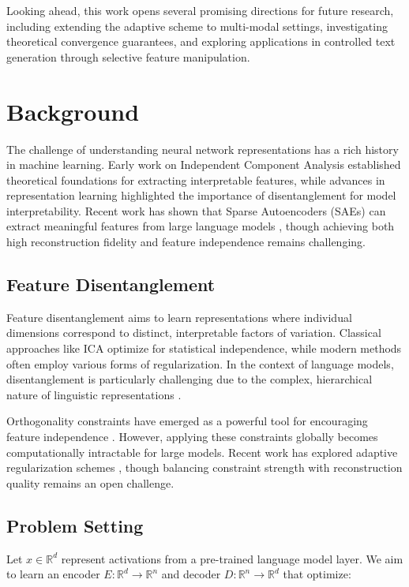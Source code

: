 \documentclass{article} %
\begin{document}
Looking ahead, this work opens several promising directions for future research, including extending the adaptive scheme to multi-modal settings, investigating theoretical convergence guarantees, and exploring applications in controlled text generation through selective feature manipulation.

\section{Background}
\label{sec:background}

The challenge of understanding neural network representations has a rich history in machine learning. Early work on Independent Component Analysis \cite{Hughes2000AUI} established theoretical foundations for extracting interpretable features, while advances in representation learning \cite{Bengio2012RepresentationLA} highlighted the importance of disentanglement for model interpretability. Recent work has shown that Sparse Autoencoders (SAEs) can extract meaningful features from large language models \cite{Cunningham2023SparseAF}, though achieving both high reconstruction fidelity and feature independence remains challenging.

\subsection{Feature Disentanglement}
Feature disentanglement aims to learn representations where individual dimensions correspond to distinct, interpretable factors of variation. Classical approaches like ICA optimize for statistical independence, while modern methods often employ various forms of regularization. In the context of language models, disentanglement is particularly challenging due to the complex, hierarchical nature of linguistic representations \cite{Burgess2018UnderstandingDI}.

Orthogonality constraints have emerged as a powerful tool for encouraging feature independence \cite{Bansal2018CanWG}. However, applying these constraints globally becomes computationally intractable for large models. Recent work has explored adaptive regularization schemes \cite{Cao2020HeteroskedasticAI}, though balancing constraint strength with reconstruction quality remains an open challenge.

\subsection{Problem Setting}
Let $x \in \mathbb{R}^d$ represent activations from a pre-trained language model layer. We aim to learn an encoder $E: \mathbb{R}^d \rightarrow \mathbb{R}^n$ and decoder $D: \mathbb{R}^n \rightarrow \mathbb{R}^d$ that optimize:
\end{document}
